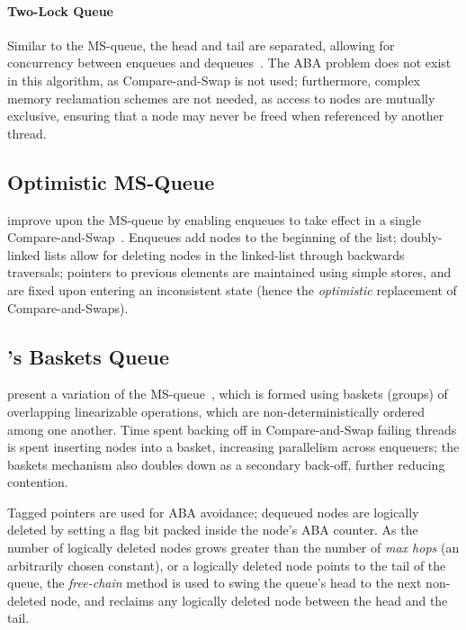 \paragraph{Two-Lock Queue}
Similar to the MS-queue, the head and tail are separated, allowing for
concurrency between enqueues and dequeues~\citep{michael1996simple}. The ABA
problem does not exist in this algorithm, as Compare-and-Swap is not used;
furthermore, complex memory reclamation schemes are not needed, as access to
nodes are mutually exclusive, ensuring that a node may never be freed when
referenced by another thread.

\subsection{Optimistic MS-Queue}
\citeauthor{ladan2008optimistic} improve upon the MS-queue by enabling enqueues
to take effect in a single Compare-and-Swap~\citep{ladan2008optimistic}.
Enqueues add nodes to the beginning of the list;
doubly-linked lists allow for deleting nodes in the linked-list through backwards
traversals;
pointers to previous elements are maintained using simple stores, and are fixed
upon entering an inconsistent state (hence the \emph{optimistic} replacement of
Compare-and-Swaps).

\subsection{\citeauthor{hoffman2007baskets}'s Baskets Queue}
\citeauthor{hoffman2007baskets} present a variation of the MS-queue~\citep{hoffman2007baskets}, which is formed
using baskets (groups) of overlapping linearizable operations, which are non-deterministically
ordered among one another.
Time spent backing off in Compare-and-Swap failing threads is
spent inserting nodes into a basket, increasing parallelism across enqueuers;
the baskets mechanism also doubles down as a secondary back-off, further reducing contention.

Tagged pointers are used for ABA avoidance; dequeued nodes are logically
deleted by setting a flag bit packed inside the node's ABA counter. 
As the number of logically deleted nodes grows greater than the number of
\emph{max hops} (an arbitrarily chosen constant), or a logically deleted node
points to the tail of the queue, the \emph{free-chain} method is used to swing
the queue's head to the next non-deleted node, and reclaims any logically
deleted node between the head and the tail.

